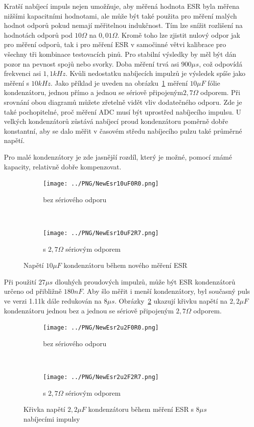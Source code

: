 Kratší nabíjecí impuls nejen umožňuje, aby měřená hodnota ESR byla měřena nižšími kapacitními hodnotami,
ale může být také použita pro měření malých hodnot odporů pokud nemají měřitelnou indukčnost.
Tím  lze snížit rozlišení na hodnotách odporů pod \(10\Omega\) na \(0,01\Omega\).
Kromě toho lze zjistit nulový odpor jak pro měření odporů, tak i pro měření ESR v samočinné
větvi kalibrace pro všechny tři kombinace testovacích pinů.
Pro stabilní výsledky by měl být dán pozor na pevnost spojů nebo svorky.
Doba měření trvá asi \(900\mu s\), což odpovídá frekvenci asi \(1,1kHz\).
Kvůli nedostatku nabíjecích impulzů je výsledek spíše jako měření s \(10kHz\).
Jako příklad je uveden na obrázku~\ref{pic:NewEsr10} měření \(10\mu F\) fólie kondenzátoru, jednou přímo a jednou se sériově připojeným\(2,7\Omega\) odporem.
Při srovnání obou diagramů můžete zřetelně vidět vliv dodatečného odporu.
Zde je také pochopitelné, proč měření ADC musí být uprostřed nabíjecího impulsu.
U velkých kondenzátorů zůstává nabíjecí proud kondenzátoru poměrně dobře konstantní,
aby se dalo měřit v časovém středu nabíjecího pulzu také průměrné napětí.

Pro malé kondenzátory je zde jasnější rozdíl, který je možné, pomocí známé kapacity, relativně dobře kompenzovat.

\begin{figure}[H]
  \begin{subfigure}[b]{.5\textwidth}
    \centering
    \texttt{[image: ../PNG/NewEsr10uF0R0.png]}
    \caption{bez sériového odporu}
  \end{subfigure}
  ~
  \begin{subfigure}[b]{.5\textwidth}
    \centering
    \texttt{[image: ../PNG/NewEsr10uF2R7.png]}
    \caption{s \(2,7\Omega\) sériovým odporem}
  \end{subfigure}
  \caption{Napětí \(10\mu F\)  kondenzátoru během nového měření ESR}
  \label{pic:NewEsr10}
\end{figure}

Při použití \(27\mu s\) dlouhých proudových impulzů, může být ESR kondenzátorů určeno od přibližně \(180nF\).
Aby šlo měřit i menší kondenzátory, byl současný puls ve verzi 1.11k dále redukován na \(8\mu s\).
Obrázky~\ref{pic:NewEsr2} ukazují křivku napětí na \(2,2\mu F\) kondenzátoru jednou bez a jednou se sériově připojeným \(2,7\Omega\) odporem.

\begin{figure}[H]
  \begin{subfigure}[b]{.5\textwidth}
    \centering
    \texttt{[image: ../PNG/NewEsr2u2F0R0.png]}
    \caption{bez sériového odporu}
  \end{subfigure}
  ~
  \begin{subfigure}[b]{.5\textwidth}
    \centering
    \texttt{[image: ../PNG/NewEsr2u2F2R7.png]}
    \caption{s \(2,7\Omega\) sériovým odporem}
  \end{subfigure}
  \caption{Křivka napětí \(2,2\mu F\) kondenzátoru během měření ESR s \(8\mu s\) nabíjecími impulsy}
  \label{pic:NewEsr2}
\end{figure}

